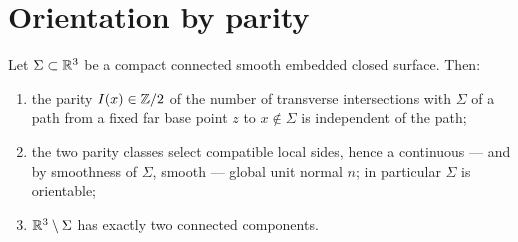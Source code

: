 \section{Orientation by parity}

\begin{proposition}
\label{prop:orientation-parity}
Let $\Sigma\subset\mathbb R^3$ be a compact connected smooth embedded closed
surface.  Then:
\begin{enumerate}[label=(\roman*)]
\item\label{it:parity-well} the parity $I(x)\in\mathbb Z/2$ of the number of
  transverse intersections with $\Sigma$ of a path from a fixed far base point
  $z$ to $x\notin\Sigma$ is independent of the path;
\item\label{it:parity-normal} the two parity classes select compatible local
  sides, hence a continuous --- and by smoothness of $\Sigma$, smooth ---
  global unit normal $n$; in particular $\Sigma$ is orientable;
\item\label{it:parity-two} $\mathbb R^3\setminus\Sigma$ has exactly two connected
  components.
\end{enumerate}
\end{proposition}

